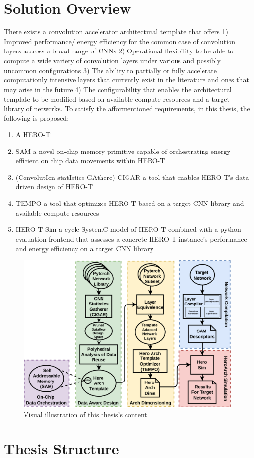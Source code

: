 \section{Solution Overview}
\label{chap:intro:solution_overview}

There exists a convolution accelerator architectural template that offers 1)
Improved performance/ energy efficiency for the common case of convolution
layers accross a broad range of \ac{CNN}s 2) Operational flexibility to be able
to compute a wide variety of convolution layers under various and possibly
uncommon configurations 3) The ability to partially or fully accelerate
computationly intensive layers that currently exist in the literature and ones
that may arise in the future 4) The configurability that enables the
architectural template to be modified based on available compute resources and a
target library of networks. To satisfy the afformentioned requirements, in this
thesis, the following is proposed: 
\begin{enumerate}
    \item A \ac{HERO-T}
    \item \ac{SAM} a novel on-chip memory primitive capable of orchestrating
    energy efficient on chip data movements within \ac{HERO-T}
    \item (ConvolutIon statIstics GAthere) \ac{CIGAR} a tool that enables \ac{HERO-T}'s data driven design of \ac{HERO-T}
    \item \ac{TEMPO} a tool that optimizes \ac{HERO-T} based on a target
    \ac{CNN} library and available compute resources 
    \item \ac{HERO-T-Sim} a cycle SystemC model of \ac{HERO-T} combined with a
python evaluation frontend that assesses a concrete \ac{HERO-T} instance's
performance and energy efficiency on a target \ac{CNN} library

  \end{enumerate}
  
\begin{figure}[ht]
    \centering
    \includegraphics[scale=0.6]{fig/intro.pdf}
    \caption{Visual illustration of this thesis's content}
    \label{fig:intro}
\end{figure}

\section{Thesis Structure}
\label{chap:intro:thesis_structure}

